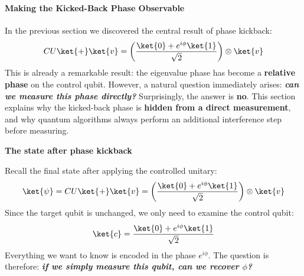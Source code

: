 \paragraph{Making the Kicked-Back Phase Observable}\label{ex:making-the-kicked-back-phase-observable}

In the previous section we discovered the central result of phase kickback:
\begin{equation*}
    CU\ket{+}\ket{v} = \left(\frac{\ket{0}+e^{i\phi}\ket{1}}{\sqrt{2}}\right) \otimes \ket{v}
\end{equation*}
This is already a remarkable result: the eigenvalue phase has become a \textbf{relative phase} on the control qubit. However, a natural question immediately arises: \emph{\textbf{can we measure this phase directly?}} Surprisingly, the answer is \textbf{no}. This section explains why the kicked-back phase is \textbf{hidden from a direct measurement}, and why quantum algorithms always perform an additional interference step before measuring.

\highspace
\begin{flushleft}
    \textcolor{Green3}{ \textbf{The state after phase kickback}}
\end{flushleft}
Recall the final state after applying the controlled unitary:
\begin{equation*}
    \ket{\psi} = CU\ket{+}\ket{v} = \left(\frac{\ket{0}+e^{i\phi}\ket{1}}{\sqrt{2}}\right) \otimes \ket{v}
\end{equation*}
Since the target qubit is unchanged, we only need to examine the control qubit:
\begin{equation*}
    \ket{c} = \frac{\ket{0}+e^{i\phi}\ket{1}}{\sqrt{2}}
\end{equation*}
Everything we want to know is encoded in the phase $e^{i\phi}$. The question is therefore: \emph{\textbf{if we simply measure this qubit, can we recover $\phi$?}}

